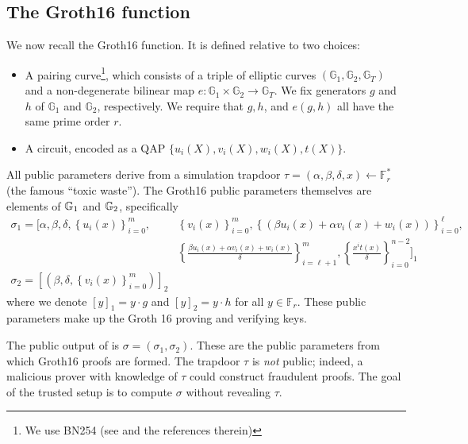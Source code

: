 \subsection{The Groth16 \Setup{} function}
We now recall the Groth16 \Setup{} function. It is defined relative to two choices:
\begin{itemize}
\item A pairing curve\footnote{We use BN254 (see \cite{Naehrig10} and the references therein)}, which consists of a triple of elliptic curves $(\mathbb{G}_1, \mathbb{G}_2,\mathbb{G}_T) $ and a non-degenerate bilinear map $e: \mathbb{G}_1 \times \mathbb{G}_2 \to \mathbb{G}_T$. We fix generators $g$ and $h$ of $\mathbb{G}_1$ and $\mathbb{G}_2$, respectively. We require that $g, h$, and $e(g,h)$ all have the same prime order $r$. 
\item A circuit, encoded as a QAP $\{u_i(X), v_i(X), w_i(X), t(X)\}$.
\end{itemize}
All public parameters derive from a simulation trapdoor $\tau = (\alpha, \beta, \delta, x) \leftarrow \mathbb{F}_r^*$ (the famous ``toxic waste''). The Groth16 public parameters themselves are elements of $\mathbb{G}_1$ and $\mathbb{G}_2$, specifically
\begin{equation}\label{eq: prover_key}
    \begin{split} %
\sigma_1 = \Biggl[ \alpha, \beta, \delta, 
    \left\{u_i(x) \right\}_{i=0}^m, &
    \left\{v_i(x) \right\}_{i=0}^m, 
    \left\{ (\beta u_i(x) + \alpha v_i(x) + w_i(x)) \right\}_{i=0}^\ell, \\
    & \left\{  \frac{\beta u_i(x) + \alpha v_i(x) + w_i(x)}{\delta} \right\}_{i=\ell+1}^m, 
    \left\{ \frac{x^i t(x)}{\delta} \right\}_{i=0}^{n-2}  \Biggr]_1 \\
\sigma_2 = \left[ \left( \beta, \delta, \left\{ v_i(x) \right\}_{i=0}^m \right) \right]_2
    \end{split}
\end{equation} 
where we denote $[y]_1 = y \cdot g$ and $[y]_2 = y \cdot h$ for all $y \in \mathbb{F}_r$. These public parameters make up the Groth 16 proving and verifying keys.

The public output of \Setup{} is $\sigma = (\sigma_1, \sigma_2)$. These are the public parameters from which Groth16 proofs are formed. The trapdoor $\tau$ is \emph{not} public; indeed, a malicious prover with knowledge of $\tau$ could construct fraudulent proofs. The goal of the trusted setup is to compute $\sigma$ without revealing $\tau$.

